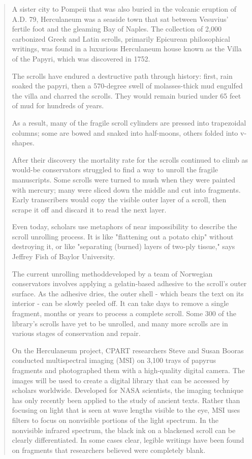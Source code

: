 \begin{quote}
A sister city to Pompeii that was also buried in the volcanic eruption 
of A.D. 79, Herculaneum was a seaside town that sat between Vesuvius' 
fertile foot and the gleaming Bay of Naples. The collection of 2,000 
carbonized Greek and Latin scrolls, primarily Epicurean philosophical 
writings, was found in a luxurious Herculaneum house known as the Villa 
of the Papyri, which was discovered in 1752.

The scrolls have endured a destructive path through history: first, rain 
soaked the papyri, then a 570-degree swell of molasses-thick mud engulfed 
the villa and charred the scrolls. They would remain buried under 65 feet 
of mud for hundreds of years.

As a result, many of the fragile scroll cylinders are pressed into 
trapezoidal columns; some are bowed and snaked into half-moons, others 
folded into v-shapes.

After their discovery the mortality rate for the scrolls continued to climb 
as would-be conservators struggled to find a way to unroll the fragile 
manuscripts. Some scrolls were turned to mush when they were painted with 
mercury; many were sliced down the middle and cut into fragments. Early 
transcribers would copy the visible outer layer of a scroll, then scrape it 
off and discard it to read the next layer.

Even today, scholars use metaphors of near impossibility to describe the 
scroll unrolling process. It is like "flattening out a potato chip" 
without destroying it, or like "separating (burned) layers of two-ply 
tissue," says Jeffrey Fish of Baylor University.

The current unrolling methoddeveloped by a team of Norwegian conservators
involves applying a gelatin-based adhesive to the scroll's outer surface. 
As the adhesive dries, the outer shell - which bears the text on its interior -
can be slowly peeled off. It can take days to remove a single fragment, 
months or years to process a complete scroll. Some 300 of the library's 
scrolls have yet to be unrolled, and many more scrolls are in various 
stages of conservation and repair.

On the Herculaneum project, CPART researchers Steve and Susan Booras 
conducted multispectral imaging (MSI) on 3,100 trays of papyrus fragments 
and photographed them with a high-quality digital camera. The images will 
be used to create a digital library that can be accessed by scholars 
worldwide. Developed for NASA scientists, the imaging technique has only 
recently been applied to the study of ancient texts. Rather than focusing 
on light that is seen at wave lengths visible to the eye, MSI uses 
filters to focus on nonvisible portions of the light spectrum. In the 
nonvisible infrared spectrum, the black ink on a blackened scroll can be 
clearly differentiated. In some cases clear, legible writings have been 
found on fragments that researchers believed were completely blank.
\end{quote}

